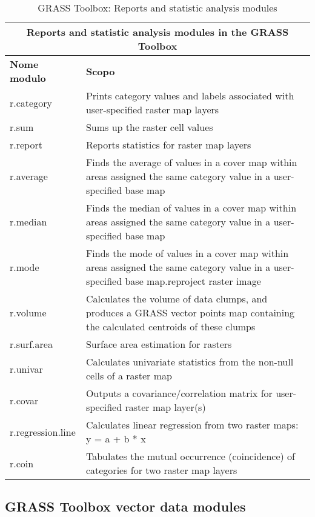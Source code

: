 \begin{table}[ht]
\centering
\caption{GRASS Toolbox: Reports and statistic analysis modules}\medskip
 \begin{tabular}{|p{4cm}|p{12cm}|}
  \hline \multicolumn{2}{|c|}{\textbf{Reports and statistic analysis modules in the GRASS Toolbox}} \\
  \hline \textbf{Nome modulo} & \textbf{Scopo} \\
  \hline r.category & Prints category values and labels associated with
  user-specified raster map layers \\
  \hline r.sum & Sums up the raster cell values \\
  \hline r.report & Reports statistics for raster map layers \\
  \hline r.average & Finds the average of values in a cover map within areas
  assigned the same category value in a user-specified base map \\
  \hline r.median & Finds the median of values in a cover map within areas
  assigned the same category value in a user-specified base map \\
  \hline r.mode & Finds the mode of values in a cover map within areas
  assigned the same category value in a user-specified base map.reproject
  raster image \\
  \hline r.volume & Calculates the volume of data clumps, and produces a
  GRASS vector points map containing the calculated centroids of these clumps \\
  \hline r.surf.area & Surface area estimation for rasters \\
  \hline r.univar & Calculates univariate statistics from the non-null cells
  of a raster map \\
  \hline r.covar & Outputs a covariance/correlation matrix for user-specified
  raster map layer(s)\\
  \hline r.regression.line & Calculates linear regression from two raster
  maps: y = a + b * x \\
  \hline r.coin & Tabulates the mutual occurrence (coincidence) of categories
  for two raster map layers\\
\hline
\end{tabular}
\end{table}

\clearpage

\subsection{GRASS Toolbox vector data modules}

